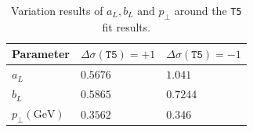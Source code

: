 \documentclass[aps,preprint,floatfix,nofootinbib,showpacs]{revtex4-1}
\begin{document}
 \begin{table}
  \begin{center}
   \begin{tabular}{l|l|l}
    \hline \hline
    Parameter \hspace{1cm} & \hspace{1cm} $\Delta\sigma(\texttt{T5}) = +1 $ & \hspace{1cm} $\Delta\sigma(\texttt{T5}) = -1 $ \\ \hline
    $a_L$     \hspace{1cm} & \hspace{1cm} $0.5676$       &  \hspace{1cm} $1.041$  \\ \hline
    $b_L$     \hspace{1cm} & \hspace{1cm} $0.5865$        &  \hspace{1cm} $0.7244$ \\ \hline
    $p_\perp (\text{GeV})$ \hspace{1cm} & \hspace{1cm} $0.3562$ &  \hspace{1cm} $0.346$ \\ \hline \hline
   \end{tabular}
  \end{center}
  \caption{Variation results of $a_L, b_L \text{ and } p_\perp$ around the \texttt{T5} fit results.}
  \label{Variation-3}
 \end{table}
\end{document}
